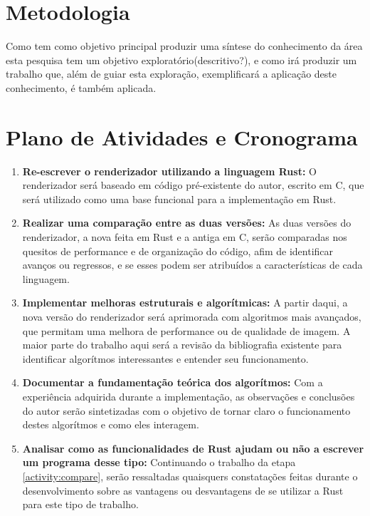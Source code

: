 \documentclass[12pt]{article}
\def\Cpp{{C\nolinebreak[4]\raisebox{.20ex}{\small\bf++}}}
\newcommand{\todo}[1]{\textsf{\color{red}#1}}
\begin{document}
\section{Metodologia}

Como tem como objetivo principal produzir uma síntese do conhecimento da área esta pesquisa tem um objetivo exploratório\todo{(descritivo?)}, e como irá produzir um trabalho que, além de guiar esta exploração, exemplificará a aplicação deste conhecimento, é também aplicada.

\section{Plano de Atividades e Cronograma}

\begin{enumerate}
	\item \label{activity:rewrite} \textbf{Re-escrever o renderizador utilizando a linguagem Rust:} O renderizador será baseado em código pré-existente do autor, escrito em \Cpp, que será utilizado como uma base funcional para a implementação em Rust.
	\item \label{activity:compare} \textbf{Realizar uma comparação entre as duas versões:} As duas versões do renderizador, a nova feita em Rust e a antiga em \Cpp, serão comparadas nos quesitos de performance e de organização do código, afim de identificar avanços ou regressos, e se esses podem ser atribuídos a características de cada linguagem.
	\item \label{activity:improve} \textbf{Implementar melhoras estruturais e algorítmicas:} A partir daqui, a nova versão do renderizador será aprimorada com algoritmos mais avançados, que permitam uma melhora de performance ou de qualidade de imagem. A maior parte do trabalho aqui será a revisão da bibliografia existente para identificar algorítmos interessantes e entender seu funcionamento.
	\item \label{activity:document} \textbf{Documentar a fundamentação teórica dos algorítmos:} Com a experiência adquirida durante a implementação, as observações e conclusões do autor serão sintetizadas com o objetivo de tornar claro o funcionamento destes algorítmos e como eles interagem.
	\item \label{activity:analysis} \textbf{Analisar como as funcionalidades de Rust ajudam ou não a escrever um programa desse tipo:} Continuando o trabalho da etapa \ref{activity:compare}, serão ressaltadas quaisquers constatações feitas durante o desenvolvimento sobre as vantagens ou desvantagens de se utilizar a Rust para este tipo de trabalho.
\end{enumerate}
\end{document}

